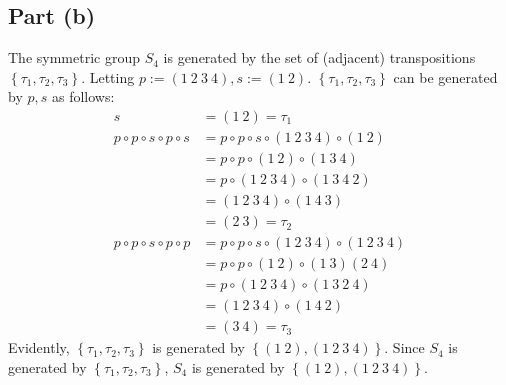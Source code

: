 \documentclass{article}
\begin{document}
\subsection*{Part (b)}
The symmetric group $S_4$ is generated by the set of (adjacent) transpositions $\left\{\tau_1, \tau_2, \tau_3\right\}$. Letting $p := \left(1~2~3~4\right), s := \left(1~2\right)$. $\left\{\tau_1, \tau_2, \tau_3\right\}$ can be generated by $p, s$ as follows:
\begin{equation}
    \begin{split}
        s & = \left(1~2\right) = \tau_1 \\
        p \circ p \circ s \circ p \circ s & = p \circ p \circ s \circ \left(1~2~3~4\right) \circ \left(1~2\right) \\
        & = p \circ p \circ \left(1~2\right) \circ \left(1~3~4\right) \\
        & = p \circ \left(1~2~3~4\right) \circ \left(1~3~4~2\right) \\
        & = \left(1~2~3~4\right) \circ \left(1~4~3\right) \\
        & = \left(2~3\right) = \tau_2 \\
        p \circ p \circ s \circ p \circ p & = p \circ p \circ s \circ \left(1~2~3~4\right) \circ \left(1~2~3~4\right) \\
        & = p \circ p \circ \left(1~2\right) \circ \left(1~3\right)\left(2~4\right) \\
        & = p \circ \left(1~2~3~4\right) \circ \left(1~3~2~4\right) \\
        & = \left(1~2~3~4\right) \circ \left(1~4~2\right) \\
        & = \left(3~4\right) = \tau_3
    \end{split}
\end{equation}
Evidently, $\left\{\tau_1, \tau_2, \tau_3\right\}$ is generated by $\left\{\left(1~2\right), \left(1~2~3~4\right)\right\}$. Since $S_4$ is generated by $\left\{\tau_1, \tau_2, \tau_3\right\}$, $S_4$ is generated by $\left\{\left(1~2\right), \left(1~2~3~4\right)\right\}$.

\newpage

\problem
\end{document}

